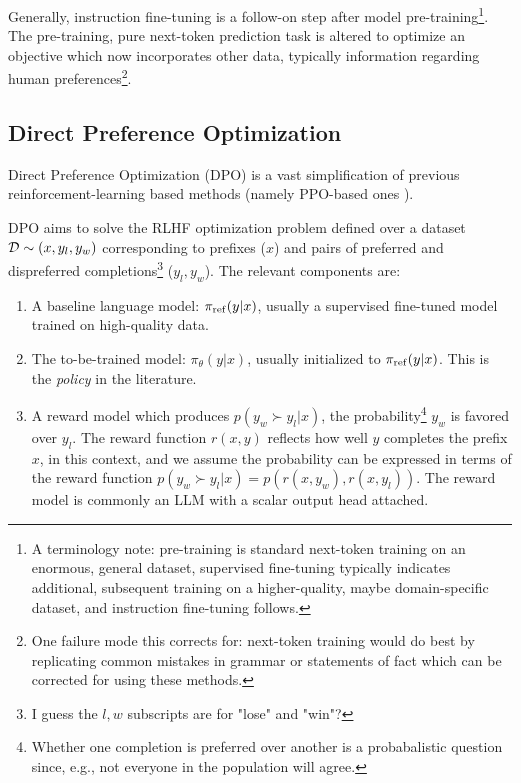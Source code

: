 \documentclass[11pt]{article}
\begin{document}
Generally, instruction fine-tuning is a follow-on step after model pre-training\footnote{A
terminology note: pre-training is standard next-token training on an enormous, general dataset, supervised
fine-tuning typically indicates additional, subsequent training on a higher-quality, maybe
domain-specific dataset, and instruction fine-tuning follows.}.
The pre-training, pure next-token prediction task is altered to optimize an objective which now
incorporates other data, typically information regarding human preferences\footnote{One failure mode
this corrects for: next-token training would do best by replicating common mistakes in grammar or
statements of fact which can be corrected for using these methods.}.


\subsection{Direct Preference Optimization \label{subsec_dpo}}

Direct Preference Optimization (DPO) \cite{rafailov2024directpreferenceoptimizationlanguage} is a
vast simplification of previous reinforcement-learning based methods (namely PPO-based ones
\cite{schulman2017proximalpolicyoptimizationalgorithms}).


DPO aims to solve the RLHF optimization problem defined over a dataset $\mathcal{D} \sim  (x, y _{ l }, y
_{ w }) $ corresponding to prefixes ($ x $) and pairs of preferred and dispreferred
completions\footnote{I guess the $ l, w $ subscripts are for "lose" and "win"?} ($ y _{ l }, y _{ w
} $). The relevant components are:
\begin{enumerate}
    \item A baseline language model: $ \pi _{ {\rm  ref} } (y|x)$, usually a supervised fine-tuned
        model trained on high-quality data.
    \item The to-be-trained model: $ \pi _{\theta } (y|x)$, usually initialized to $ \pi _{ {\rm
        ref} } (y|x)$. This is the \textit{policy} in the literature.
    \item A reward model which produces $ p(y _{ w } \succ y _{ l }| x ) $, the
        probability\footnote{Whether one completion is preferred over another is a probabalistic
        question since, e.g., not everyone in the population will agree.} $ y _{ w } $ is favored
        over $ y _{ l } $.  The reward function $ r(x, y) $ reflects how well $ y $ completes the
        prefix $ x $, in this context, and we assume the probability can be expressed in terms of
        the reward function $ p(y _{ w } \succ y _{ l }| x ) = p( r(x, y _{ w }), r(x, y _{ l }) )
        $. The reward model is commonly an LLM with a scalar output head attached.
\end{enumerate}
\end{document}
